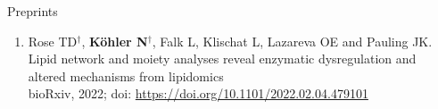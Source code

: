 


\datedsubsection{}
{%
}
{%
	Preprints
}
{%
	\begin{enumerate}
		\item Rose TD$^{\dagger}$, \textbf{K\"ohler N}$^{\dagger}$, Falk L, Klischat L, Lazareva OE and Pauling JK.\\
			Lipid network and moiety analyses reveal enzymatic dysregulation and altered mechanisms from lipidomics\\
			bioRxiv, 2022; doi: \url{https://doi.org/10.1101/2022.02.04.479101}
		\setcounter{publicationCounter}{\value{enumi}}
	\end{enumerate}
}


